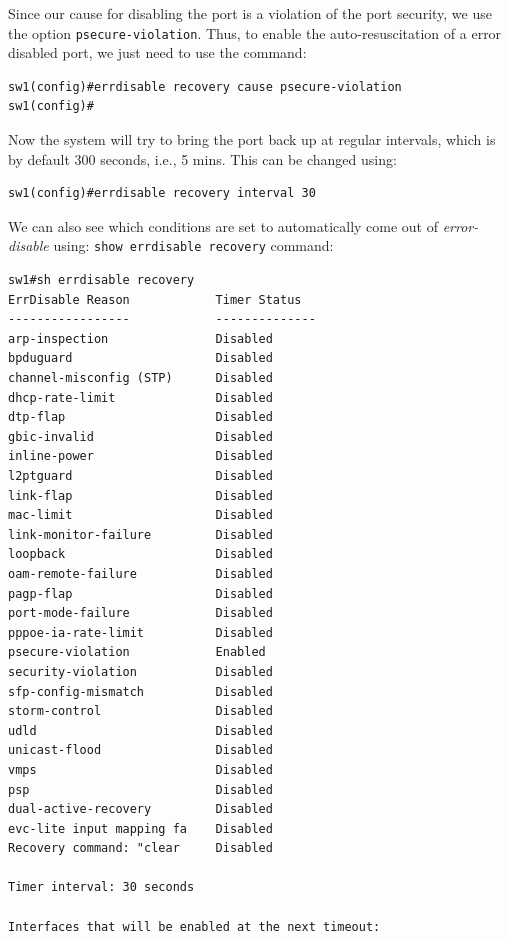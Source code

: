 \noindent
Since our cause for disabling the port is a violation of the port security, we use the option \verb|psecure-violation|. Thus, to enable the auto-resuscitation of a error disabled port, we just need to use the command:

\vspace{-15pt}
\begin{verbatim}
sw1(config)#errdisable recovery cause psecure-violation
sw1(config)#
\end{verbatim}
\vspace{-10pt}

\noindent
Now the system will try to bring the port back up at regular intervals, which is by default 300 seconds, i.e., 5 mins. This can be changed using:

\vspace{-15pt}
\begin{verbatim}
sw1(config)#errdisable recovery interval 30
\end{verbatim}
\vspace{-10pt}

\noindent
We can also see which conditions are set to automatically come out of \textit{error-disable} using: \verb|show errdisable recovery| command:

\vspace{-15pt}
\begin{verbatim}
sw1#sh errdisable recovery
ErrDisable Reason            Timer Status
-----------------            --------------
arp-inspection               Disabled
bpduguard                    Disabled
channel-misconfig (STP)      Disabled
dhcp-rate-limit              Disabled
dtp-flap                     Disabled
gbic-invalid                 Disabled
inline-power                 Disabled
l2ptguard                    Disabled
link-flap                    Disabled
mac-limit                    Disabled
link-monitor-failure         Disabled
loopback                     Disabled
oam-remote-failure           Disabled
pagp-flap                    Disabled
port-mode-failure            Disabled
pppoe-ia-rate-limit          Disabled
psecure-violation            Enabled
security-violation           Disabled
sfp-config-mismatch          Disabled
storm-control                Disabled
udld                         Disabled
unicast-flood                Disabled
vmps                         Disabled
psp                          Disabled
dual-active-recovery         Disabled
evc-lite input mapping fa    Disabled
Recovery command: "clear     Disabled

Timer interval: 30 seconds

Interfaces that will be enabled at the next timeout:
\end{verbatim}
\vspace{-10pt}

